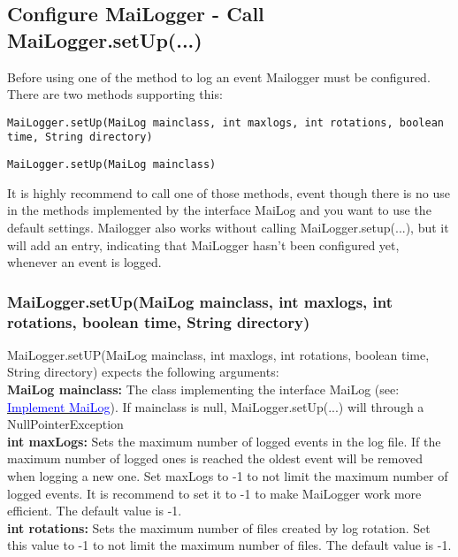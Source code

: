 \documentclass{article}
\newcommand{\refh}[2]{\hyperref[#1] {\textcolor{blue}{#2}}}
\begin{document}
    \subsection{Configure MaiLogger - Call MaiLogger.setUp(...)}
    \label{setup_mailogger.setup}
    Before using one of the method to log an event Mailogger must be configured.
    There are two methods supporting this:
    \begin{description}
        \item \lstinline|MaiLogger.setUp(MaiLog mainclass, int maxlogs, int rotations, boolean time, String directory)|
        \item \lstinline|MaiLogger.setUp(MaiLog mainclass)|
    \end{description}

    It is highly recommend to call one of those methods, event though there is no use in the methods implemented by the interface MaiLog and you want to use the default settings.
    Mailogger also works without calling MaiLogger.setup(...), but it will add an entry, indicating that MaiLogger hasn't been configured yet, whenever an event is logged.

    \subsubsection{MaiLogger.setUp(MaiLog mainclass, int maxlogs, int rotations, boolean time, String directory)}
    \label{setup_mailogger.setup_1}
    MaiLogger.setUP(MaiLog mainclass, int maxlogs, int rotations, boolean time, String directory) expects the following arguments: \\

    \textbf{MaiLog mainclass:}
    The class implementing the interface MaiLog (see: \refh{setup_interface}{Implement MaiLog}).
    If mainclass is null, MaiLogger.setUp(...) will through a NullPointerException \\

    \textbf{int maxLogs:}
    Sets the maximum number of logged events in the log file.
    If the maximum number of logged ones is reached the oldest event will be removed when logging a new one.
    Set maxLogs to -1 to not limit the maximum number of logged events.
    It is recommend to set it to -1 to make MaiLogger work more efficient.
    The default value is -1. \\

    \textbf{int rotations:}
    Sets the maximum number of files created by log rotation.
    Set this value to -1 to not limit the maximum number of files.
    The default value is -1. \\
\end{document}
